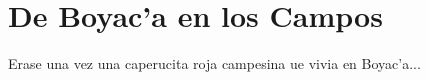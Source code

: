 \chapter{De Boyac'a en los Campos}
Erase una vez una caperucita roja campesina ue vivia en Boyac'a...